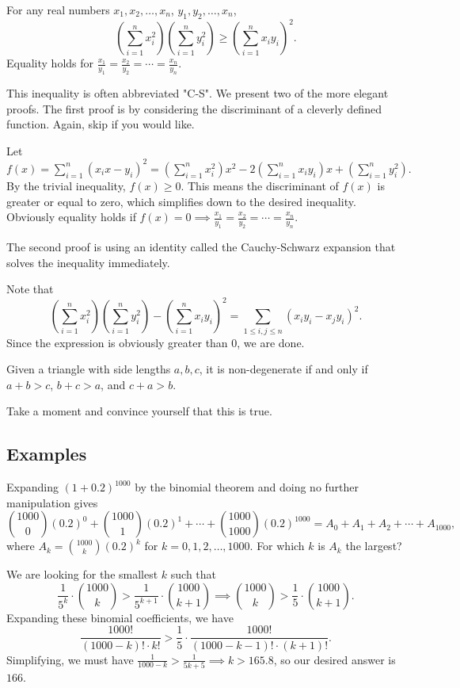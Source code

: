 \documentclass[blue,onecol]{shooting}
\begin{document}
\begin{theo} 
For any real numbers $x_1,x_2,\ldots,x_n$, $y_1,y_2,\ldots,x_n$,  \[\left(\sum_{i=1}^n x_i^2\right)\left(\sum_{i=1}^n y_i^2\right)\ge\left(\sum_{i=1}^n x_iy_i\right)^2.\] Equality holds for $\frac{x_1}{y_1}=\frac{x_2}{y_2}=\cdots=\frac{x_n}{y_n}$. 
\end{theo}
This inequality is often abbreviated "C-S". We present two of the more elegant proofs. The first proof is by considering the discriminant of a cleverly defined function. Again, skip if you would like.
\begin{pro}
Let $f(x)=\sum_{i=1}^n (x_ix-y_i)^2=\left(\sum_{i=1}^n x_i^2\right)x^2-2\left(\sum_{i=1}^n x_iy_i\right)x+\left(\sum_{i=1}^n y_i^2\right). $ By the trivial inequality, $f(x)\ge 0$. This means the discriminant of $f(x)$ is greater or equal to zero, which simplifies down to the desired inequality. Obviously equality holds if $f(x)=0\implies \frac{x_1}{y_1}=\frac{x_2}{y_2}=\cdots=\frac{x_n}{y_n}$. 
\end{pro}

The second proof is using an identity called the Cauchy-Schwarz expansion that solves the inequality immediately. 
\begin{pro}
Note that
\[\left(\sum_{i=1}^n x_i^2\right)\left(\sum_{i=1}^ny_i^2\right)-\left(\sum_{i=1}^n x_iy_i\right)^2=\sum_{1\leq i,j\leq n}(x_iy_i-x_jy_i)^2.\] Since the expression is obviously greater than $0$, we are done.
\end{pro}

\begin{theo} 
Given a triangle with side lengths $a,b,c$, it is non-degenerate if and only if $a+b>c$, $b+c>a$, and $c+a>b.$
\end{theo}
Take a moment and convince yourself that this is true. 
\subsection{Examples}

\begin{exam}[AIME 1991/3]
Expanding $(1+0.2)^{1000}$ by the binomial theorem and doing no further manipulation gives
\[\binom{1000}0(0.2)^0+\binom{1000}1(0.2)^1+\cdots+\binom{1000}{1000}(0.2)^{1000}= A_0 + A_1 + A_2 + \cdots + A_{1000},\]
where $A_k = \binom{1000}k(0.2)^k$ for $k = 0,1,2,\ldots,1000$. For which $k$ is $A_k$ the largest?
\end{exam}
\begin{sol}
We are looking for the smallest $k$ such that \[\frac1{5^k}\cdot\binom{1000}k>\frac1{5^{k+1}}\cdot \binom{1000}{k+1}\implies \binom{1000}k>\frac15\cdot \binom{1000}{k+1}.\] Expanding these binomial coefficients, we have \[\frac{1000!}{(1000-k)!\cdot k!}>\frac15\cdot\frac{1000!}{(1000-k-1)!\cdot (k+1)!}. \] Simplifying, we must have $\frac1{1000-k}>\frac1{5k+5}\implies k>165.8$, so our desired answer is $166$. 
\end{sol}
\end{document}
